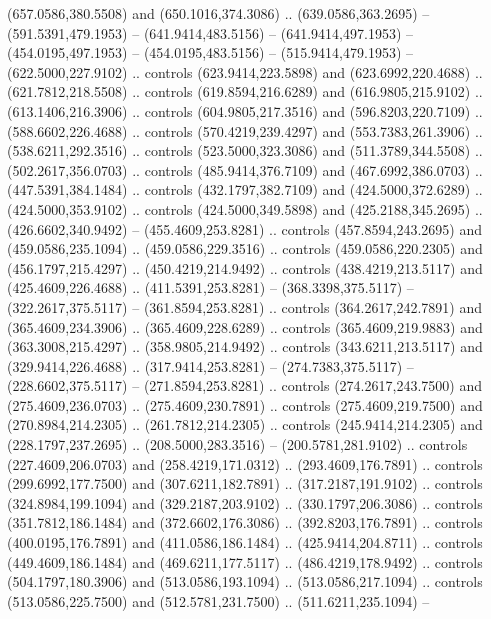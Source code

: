 {{\begin{scope}[y=-0.80pt,x=0.80pt,scale=0.038,xshift=-420pt,yshift=270pt]
        (657.0586,380.5508) and (650.1016,374.3086) .. (639.0586,363.2695) --
        (591.5391,479.1953) -- (641.9414,483.5156) -- (641.9414,497.1953) --
        (454.0195,497.1953) -- (454.0195,483.5156) -- (515.9414,479.1953) --
        (622.5000,227.9102) .. controls (623.9414,223.5898) and (623.6992,220.4688) ..
        (621.7812,218.5508) .. controls (619.8594,216.6289) and (616.9805,215.9102) ..
        (613.1406,216.3906) .. controls (604.9805,217.3516) and (596.8203,220.7109) ..
        (588.6602,226.4688) .. controls (570.4219,239.4297) and (553.7383,261.3906) ..
        (538.6211,292.3516) .. controls (523.5000,323.3086) and (511.3789,344.5508) ..
        (502.2617,356.0703) .. controls (485.9414,376.7109) and (467.6992,386.0703) ..
        (447.5391,384.1484) .. controls (432.1797,382.7109) and (424.5000,372.6289) ..
        (424.5000,353.9102) .. controls (424.5000,349.5898) and (425.2188,345.2695) ..
        (426.6602,340.9492) -- (455.4609,253.8281) .. controls (457.8594,243.2695) and
        (459.0586,235.1094) .. (459.0586,229.3516) .. controls (459.0586,220.2305) and
        (456.1797,215.4297) .. (450.4219,214.9492) .. controls (438.4219,213.5117) and
        (425.4609,226.4688) .. (411.5391,253.8281) -- (368.3398,375.5117) --
        (322.2617,375.5117) -- (361.8594,253.8281) .. controls (364.2617,242.7891) and
        (365.4609,234.3906) .. (365.4609,228.6289) .. controls (365.4609,219.9883) and
        (363.3008,215.4297) .. (358.9805,214.9492) .. controls (343.6211,213.5117) and
        (329.9414,226.4688) .. (317.9414,253.8281) -- (274.7383,375.5117) --
        (228.6602,375.5117) -- (271.8594,253.8281) .. controls (274.2617,243.7500) and
        (275.4609,236.0703) .. (275.4609,230.7891) .. controls (275.4609,219.7500) and
        (270.8984,214.2305) .. (261.7812,214.2305) .. controls (245.9414,214.2305) and
        (228.1797,237.2695) .. (208.5000,283.3516) -- (200.5781,281.9102) .. controls
        (227.4609,206.0703) and (258.4219,171.0312) .. (293.4609,176.7891) .. controls
        (299.6992,177.7500) and (307.6211,182.7891) .. (317.2187,191.9102) .. controls
        (324.8984,199.1094) and (329.2187,203.9102) .. (330.1797,206.3086) .. controls
        (351.7812,186.1484) and (372.6602,176.3086) .. (392.8203,176.7891) .. controls
        (400.0195,176.7891) and (411.0586,186.1484) .. (425.9414,204.8711) .. controls
        (449.4609,186.1484) and (469.6211,177.5117) .. (486.4219,178.9492) .. controls
        (504.1797,180.3906) and (513.0586,193.1094) .. (513.0586,217.1094) .. controls
        (513.0586,225.7500) and (512.5781,231.7500) .. (511.6211,235.1094) --

\end{scope}}}
